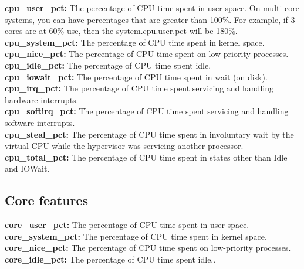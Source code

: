 \documentclass{iosart2c}
\begin{document}
\textbf{cpu\_user\_pct:} The percentage of CPU time spent in user space. On multi-core systems, you can have percentages that are greater than 100\%. For example, if 3 cores are at 60\% use, then the system.cpu.user.pct will be 180\%.\\

\textbf{cpu\_system\_pct:} The percentage of CPU time spent in kernel space.\\

\textbf{cpu\_nice\_pct:} The percentage of CPU time spent on low-priority processes.\\

\textbf{cpu\_idle\_pct:} The percentage of CPU time spent idle.\\

\textbf{cpu\_iowait\_pct:} The percentage of CPU time spent in wait (on disk).\\

\textbf{cpu\_irq\_pct:} The percentage of CPU time spent servicing and handling hardware interrupts.\\

\textbf{cpu\_softirq\_pct:} The percentage of CPU time spent servicing and handling software interrupts.\\

\textbf{cpu\_steal\_pct:} The percentage of CPU time spent in involuntary wait by the virtual CPU while the hypervisor was servicing another processor.\\

\textbf{cpu\_total\_pct:} The percentage of CPU time spent in states other than Idle and IOWait.\\


\subsection{Core features}

\textbf{core\_user\_pct:} The percentage of CPU time spent in user space.\\

\textbf{core\_system\_pct:} The percentage of CPU time spent in kernel space.\\

\textbf{core\_nice\_pct:} The percentage of CPU time spent on low-priority processes.\\

\textbf{core\_idle\_pct:} The percentage of CPU time spent idle..\\
\end{document}
